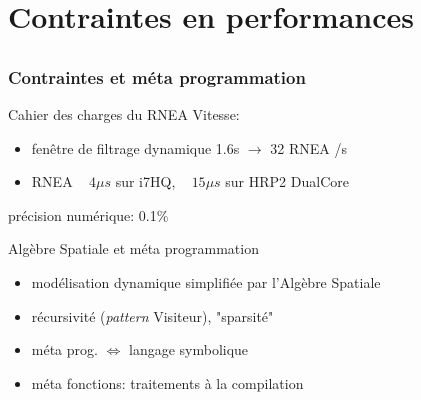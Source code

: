 \documentclass[10pt]{beamer}
\begin{document}
\section{Contraintes en performances}

\subsection{}

\begin{frame}
  \frametitle{Contraintes et méta programmation}

	\begin{block}{Cahier des charges du RNEA}
	Vitesse:
	\begin{itemize}
	\item fenêtre de filtrage dynamique 1.6s $\longrightarrow$ 32 RNEA /s
	\item  RNEA ~ $4\mu s$ sur i7HQ, ~ $15\mu s$ sur HRP2 DualCore 
	\end{itemize}
	
	précision numérique: 0.1\%
	\end{block}
	
  \begin{block}{Algèbre Spatiale et méta programmation}
  
  \begin{itemize}
  \item modélisation dynamique simplifiée par l'Algèbre Spatiale \\
  \item récursivité (\emph{pattern} Visiteur), "sparsité" 
  \item méta prog. $\iff$ langage symbolique 
  \item méta fonctions: traitements à la compilation \\
  \end{itemize}
	\end{block}
  
\end{frame}
\end{document}

